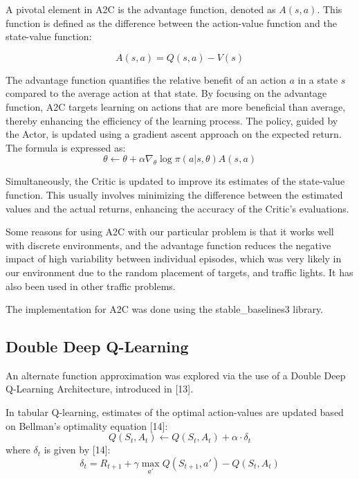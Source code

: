 \documentclass{article}
\begin{document}
	A pivotal element in A2C is the advantage function, denoted as \( A(s, a) \). This function is defined as the difference between the action-value function and the state-value function: 
	
	\begin{equation}
		A(s, a) = Q(s, a) - V(s)
	\end{equation}
	
	The advantage function quantifies the relative benefit of an action \( a \) in a state \( s \) compared to the average action at that state. By focusing on the advantage function, A2C targets learning on actions that are more beneficial than average, thereby enhancing the efficiency of the learning process. The policy, guided by the Actor, is updated using a gradient ascent approach on the expected return. The formula is expressed as: 
	\begin{equation}
		\theta \leftarrow \theta + \alpha \nabla_{\theta} \log \pi(a | s, \theta) A(s, a)
	\end{equation}
	
	Simultaneously, the Critic is updated to improve its estimates of the state-value function. This usually involves minimizing the difference between the estimated values and the actual returns, enhancing the accuracy of the Critic's evaluations.
	
	Some reasons for using A2C with our particular problem is that it works well with discrete environments, and the advantage function reduces the negative impact of high variability between individual episodes, which was very likely in our environment due to the random placement of targets, and traffic lights. It has also been used in other traffic problems.
	
	The implementation for A2C was done using the stable\_baselines3 library.
	
	
	\subsection{Double Deep Q-Learning}
	
	An alternate function approximation was explored via the use of a Double Deep Q-Learning Architecture, introduced in [13].
	
	In tabular Q-learning, estimates of the optimal action-values are updated based on Bellman's optimality equation [14]:
	\begin{equation}
		Q(S_{t}, A_{t}) \leftarrow Q(S_{t}, A_{t}) + \alpha\cdot\delta_{t}
	\end{equation}
	where $\delta_{t}$ is given by [14]:
	\begin{equation}
		\delta_{t} = R_{t+1} + \gamma\max_{a'}Q(S_{t+1}, a') - Q(S_{t}, A_{t})
	\end{equation}
	
\end{document}

